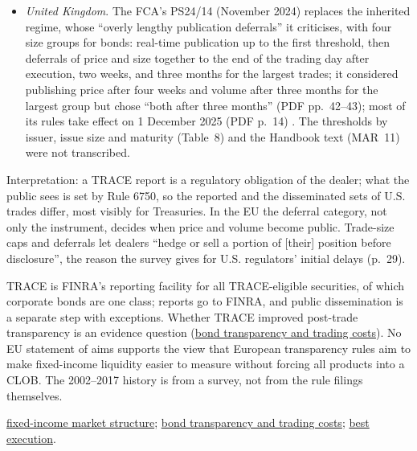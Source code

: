 \begin{qfrule}
\begin{itemize}
\begin{itemize}
\end{itemize}
These agree with ESMA's worked examples above.
\item \emph{United Kingdom}. The FCA's PS24/14 (November 2024) replaces the inherited regime, whose ``overly lengthy publication deferrals'' it criticises, with four size groups for bonds: real-time publication up to the first threshold, then deferrals of price and size together to the end of the trading day after execution, two weeks, and three months for the largest trades; it considered publishing price after four weeks and volume after three months for the largest group but chose ``both after three months'' (PDF pp.~42--43); most of its rules take effect on 1 December 2025 (PDF p.~14) \citep[PS24/14, chaps.~2--5, PDF pp.~12, 14 and~42--43]{fca-ps24-14}. The thresholds by issuer, issue size and maturity (Table~8) and the Handbook text (MAR~11) were not transcribed.
\end{itemize}

 Interpretation: a TRACE report is a regulatory obligation of the dealer; what the public sees is set by Rule 6750, so the reported and the disseminated sets of U.S. trades differ, most visibly for Treasuries. In the EU the deferral category, not only the instrument, decides when price and volume become public. Trade-size caps and deferrals let dealers ``hedge or sell a portion of [their] position before disclosure'', the reason the survey gives for U.S. regulators' initial delays (p.~29).

 TRACE is FINRA's reporting facility for all TRACE-eligible securities, of which corporate bonds are one class; reports go to FINRA, and public dissemination is a separate step with exceptions. Whether TRACE improved post-trade transparency is an evidence question (\hyperref[ev:bond-transparency-trading-costs]{bond transparency and trading costs}). No EU statement of aims supports the view that European transparency rules aim to make fixed-income liquidity easier to measure without forcing all products into a CLOB. The 2002--2017 history is from a survey, not from the rule filings themselves.

 \hyperref[def:fixed-income-market-structure]{fixed-income market structure}; \hyperref[ev:bond-transparency-trading-costs]{bond transparency and trading costs}; \hyperref[def:best-execution]{best execution}.

\end{qfrule}

